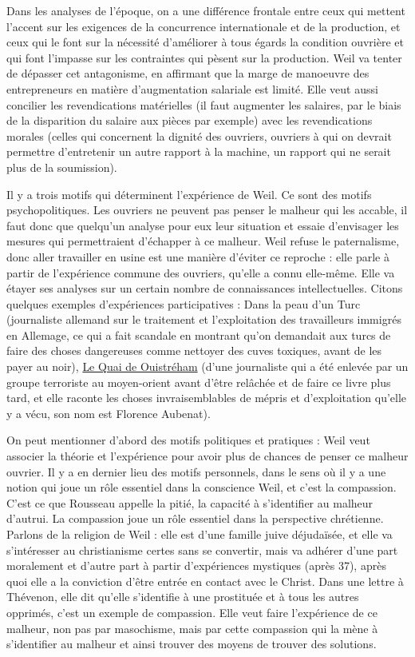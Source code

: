 \documentclass[a4paper,12pt]{book}
\begin{document}
\par Dans les analyses de l'époque, on a une différence frontale entre ceux qui mettent l'accent sur les exigences de la concurrence internationale et de la production, et ceux qui le font sur la nécessité d'améliorer à tous égards la condition ouvrière et qui font l'impasse sur les contraintes qui pèsent sur la production. Weil va tenter de dépasser cet antagonisme, en affirmant que la marge de manoeuvre des entrepreneurs en matière d'augmentation salariale est limité. Elle veut aussi concilier les revendications matérielles (il faut augmenter les salaires, par le biais de la disparition du salaire aux pièces par exemple) avec les revendications morales (celles qui concernent la dignité des ouvriers, ouvriers à qui on devrait permettre d'entretenir un autre rapport à la machine, un rapport qui ne serait plus de la soumission).
\par Il y a trois motifs qui déterminent l'expérience de Weil. Ce sont des motifs psychopolitiques. Les ouvriers ne peuvent pas penser le malheur qui les accable, il faut donc que quelqu'un analyse pour eux leur situation et essaie d'envisager les mesures qui permettraient d'échapper à ce malheur. Weil refuse le paternalisme, donc aller travailler en usine est une manière d'éviter ce reproche : elle parle à partir de l'expérience commune des ouvriers, qu'elle a connu elle-même. Elle va étayer ses analyses sur un certain nombre de connaissances intellectuelles. Citons quelques exemples d'expériences participatives : Dans la peau d'un Turc (journaliste allemand sur le traitement et l'exploitation des travailleurs immigrés en Allemage, ce qui a fait scandale en montrant qu'on demandait aux turcs de faire des choses dangereuses comme nettoyer des cuves toxiques, avant de les payer au noir), \underline{Le Quai de Ouistréham} (d'une journaliste qui a été enlevée par un groupe terroriste au moyen-orient avant d'être relâchée et de faire ce livre plus tard, et elle raconte les choses invraisemblables de mépris et d'exploitation qu'elle y a vécu, son nom est Florence Aubenat).
\par On peut mentionner d'abord des motifs politiques et pratiques : Weil veut associer la théorie et l'expérience pour avoir plus de chances de penser ce malheur ouvrier. Il y a en dernier lieu des motifs personnels, dans le sens où il y a une notion qui joue un rôle essentiel dans la conscience Weil, et c'est la compassion. C'est ce que Rousseau appelle la pitié, la capacité à s'identifier au malheur d'autrui. La compassion joue un rôle essentiel dans la perspective chrétienne. Parlons de la religion de Weil : elle est d'une famille juive déjudaïsée, et elle va s'intéresser au christianisme certes sans se convertir, mais va adhérer d'une part moralement et d'autre part à partir d'expériences mystiques (après 37), après quoi elle a la conviction d'être entrée en contact avec le Christ. Dans une lettre à Thévenon, elle dit qu'elle s'identifie à une prostituée et à tous les autres opprimés, c'est un exemple de compassion. Elle veut faire l'expérience de ce malheur, non pas par masochisme, mais par cette compassion qui la mène à s'identifier au malheur et ainsi trouver des moyens de trouver des solutions.
\end{document}
